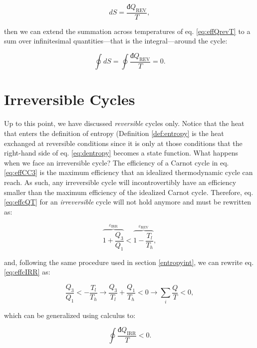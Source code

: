 \documentclass[
]{book}
\theoremstyle{definition}
\theoremstyle{definition}
\theoremstyle{definition}
\theoremstyle{remark}
\begin{document}
\begin{equation}
dS = \frac{đQ_{\mathrm{REV}}}{T},
\label{eq:dentropy}
\end{equation}

then we can extend the summation across temperatures of eq. \eqref{eq:effQrevT} to a sum over infinitesimal quantities---that is the integral---around the cycle:

\begin{equation}
\oint dS = \oint \frac{đQ_{\mathrm{REV}}}{T} = 0.
\label{eq:ds0}
\end{equation}

\hypertarget{irreversible-cycles}{%
\section{Irreversible Cycles}\label{irreversible-cycles}}

Up to this point, we have discussed \emph{reversible} cycles only. Notice that the heat that enters the definition of entropy (Definition \ref{def:entropy} is the heat exchanged at reversible conditions since it is only at those conditions that the right-hand side of eq. \eqref{eq:dentropy} becomes a state function. What happens when we face an irreversible cycle? The efficiency of a Carnot cycle in eq. \eqref{eq:effCC3} is the maximum efficiency that an idealized thermodynamic cycle can reach. As such, any irreversible cycle will incontrovertibly have an efficiency smaller than the maximum efficiency of the idealized Carnot cycle. Therefore, eq. \eqref{eq:effcQT} for an \emph{irreversible} cycle will not hold anymore and must be rewritten as:

\begin{equation}
\overbrace{1+\frac{Q_3}{Q_1}}^{\varepsilon_{\mathrm{IRR}}} < \overbrace{1-\frac{T_l}{T_h}}^{\varepsilon_{\mathrm{REV}}},
\label{eq:effcIRR}
\end{equation}

and, following the same procedure used in section \ref{entropyint}, we can rewrite eq. \eqref{eq:effcIRR} as:

\begin{equation}
\frac{Q_3}{Q_1} < - \frac{T_l}{T_h} \longrightarrow \frac{Q_3}{T_l} + \frac{Q_1}{T_h} < 0 \longrightarrow \sum_i \frac{Q}{T} < 0,
\label{eq:effcIRR2}
\end{equation}

which can be generalized using calculus to:

\begin{equation}
\oint \frac{đQ_{\mathrm{IRR}}}{T} < 0.
\label{eq:dqirrineq}
\end{equation}
\end{document}
